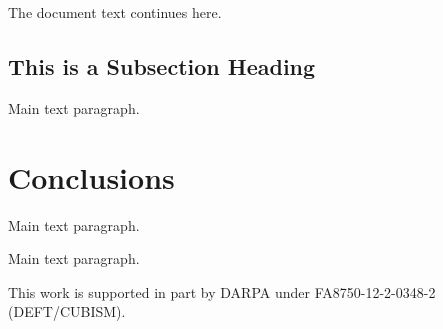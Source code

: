 \documentclass[remotesensing,article,accept,moreauthors,pdftex,12pt,a4paper]{mdpi}
\begin{document}
The document text continues here.

\subsection{This is a Subsection Heading}

Main text paragraph.


\section{Conclusions}

Main text paragraph.


Main text paragraph.



This work is supported in part by DARPA under
FA8750-12-2-0348-2 (DEFT/CUBISM).









\end{document}

